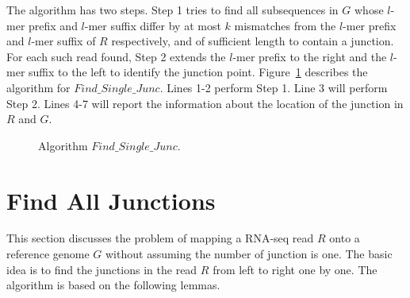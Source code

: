 \documentclass{article}
\begin{document}
The algorithm has two steps.
Step 1 tries to find all subsequences in $G$ whose $l$-mer prefix and $l$-mer suffix differ by at most $k$ mismatches from the $l$-mer prefix and $l$-mer suffix of $R$ respectively, and of sufficient length to contain a junction.
For each such read found, Step 2 extends the $l$-mer prefix to the right and the $l$-mer suffix to the left to identify the junction point.
Figure~\ref{algo-single-junc} describes the algorithm
for $Find\_Single\_Junc$.
Lines 1-2 perform Step 1.
 Line 3 will perform Step 2.
 Lines 4-7 will report the information about the location of the junction in $R$ and $G$. 
\begin{figure}[h]
\begin{center}

\end{center}
\caption{Algorithm $Find\_Single\_Junc$.}
\label{algo-single-junc}
\end{figure}

\section{Find All Junctions}
This section discusses the problem of mapping a RNA-seq read $R$
onto a reference genome $G$ without assuming the number of junction
is one.
The basic idea is to find the junctions in the read $R$
from left to right one by one.
The algorithm is based on the following lemmas.
\end{document}
